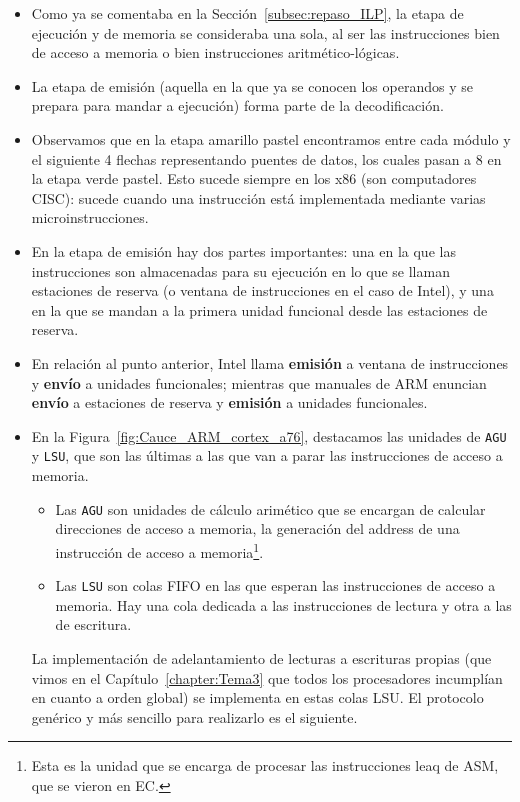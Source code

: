 \begin{itemize}
    \item Como ya se comentaba en la Sección~\ref{subsec:repaso_ILP}, la etapa de ejecución y de memoria se consideraba una sola, al ser las instrucciones bien de acceso a memoria o bien instrucciones aritmético-lógicas.
    \item La etapa de emisión (aquella en la que ya se conocen los operandos y se prepara para mandar a ejecución) forma parte de la decodificación.
    \item Observamos que en la etapa amarillo pastel encontramos entre cada módulo y el siguiente 4 flechas representando puentes de datos, los cuales pasan a 8 en la etapa verde pastel. Esto sucede siempre en los x86 (son computadores CISC): sucede cuando una instrucción está implementada mediante varias microinstrucciones.
    \item En la etapa de emisión hay dos partes importantes: una en la que las instrucciones son almacenadas para su ejecución en lo que se llaman estaciones de reserva (o ventana de instrucciones en el caso de Intel), y una en la que se mandan a la primera unidad funcional desde las estaciones de reserva.
    \item En relación al punto anterior, Intel llama \textbf{emisión} a ventana de instrucciones y \textbf{envío} a unidades funcionales; mientras que manuales de ARM enuncian \textbf{envío} a estaciones de reserva y \textbf{emisión} a unidades funcionales.
    \item En la Figura~\ref{fig:Cauce_ARM_cortex_a76}, destacamos las unidades de \verb|AGU| y \verb|LSU|, que son las últimas a las que van a parar las instrucciones de acceso a memoria.
        \begin{itemize}
            \item Las \verb|AGU| son unidades de cálculo arimético que se encargan de calcular direcciones de acceso a memoria, la generación del address de una instrucción de acceso a memoria\footnote{Esta es la unidad que se encarga de procesar las instrucciones leaq de ASM, que se vieron en EC.}.
            \item Las \verb|LSU| son colas FIFO en las que esperan las instrucciones de acceso a memoria. Hay una cola dedicada a las instrucciones de lectura y otra a las de escritura. 
        \end{itemize}
    La implementación de adelantamiento de lecturas a escrituras propias (que vimos en el Capítulo~\ref{chapter:Tema3} que todos los procesadores incumplían en cuanto a orden global) se implementa en estas colas LSU\@. El protocolo genérico y más sencillo para realizarlo es el siguiente.


\end{itemize}
